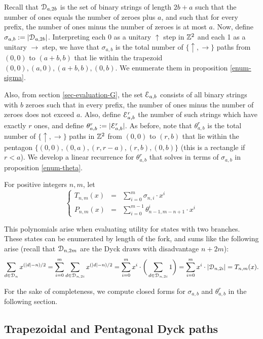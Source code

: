 Recall that $\mathcal{D}_{a,2b}$ is the set of binary strings of length $2b+a$ such that the number of ones equals the number of zeroes plus $a$, and such that for every prefix, the number of ones minus the number of zeroes is at most $a$. Now, define $\sigma_{a,b}:=|\mathcal{D}_{a,2b}|$. Interpreting each 0 as a unitary $\uparrow$ step in $\mathbb{Z}^2$ and each 1 as a unitary $\rightarrow$ step, we have that $\sigma_{a,b}$ is the total number of $\{\uparrow,\rightarrow\}$ paths from $(0,0)$ to $(a+b,b)$ that lie within the trapezoid ${(0,0),(a,0),(a+b,b),(0,b)}$. We enumerate them in proposition \ref{enum-sigma}.

Also, from section \ref{sec-evaluation-G}, the set $\mathcal{E}_{a,b}$ consists of all binary strings with $b$ zeroes such that in every prefix, the number of ones minus the number of zeroes does not exceed $a$. Also, define $\mathcal{E}_{a,b}^r$ the number of such strings which have exactly $r$ ones, and define $\theta_{a,b}^r:= |\mathcal{E}_{a,b}^r|$. As before, note that $\theta_{a,b}^r$ is the total number of $\{\uparrow,\rightarrow\}$ paths in $\mathbb{Z}^2$ from $(0,0)$ to $(r,b)$ that lie within the pentagon $\{(0,0),(0,a),(r,r-a), (r,b), (0,b)\}$ (this is a rectangle if $r<a$). We develop a linear recurrence for $\theta_{a,b}^r$ that solves in terms of $\sigma_{a,b}$ in proposition \ref{enum-theta}. 

\begin{mydef}
For positive integers $n,m$, let
$$
\left\{
\begin{array}{lll}
T_{n,m}(x) &=& \displaystyle \sum_{i = 0}^{m} \sigma_{n,i}\cdot x^i\\
P_{n,m}(x) &=& \displaystyle \sum_{i = 0}^{m-1} \theta_{n-1,m-n+1}^i\cdot x^i
\end{array}
\right.
$$
\end{mydef}

This polynomials arise when evaluating utility for states with two branches. These states can be enumerated by length of the fork, and sums like the following arise (recall that $\mathcal{D}_{n,2m}$ are the Dyck draws with disadvantage $n+2m$):
$$
\sum_{d\in \mathcal{D}_{n}} x^{(|d|-n)/2} = \sum_{i=0}^m \sum_{d\in \mathcal{D}_{n,2i}} x^{(|d|-n)/2} = \sum_{i=0}^m x^i\cdot  \bigg(\sum_{d\in\mathcal{D}_{n,2i}} 1\bigg) = \sum_{i=0}^m x^i\cdot |\mathcal{D}_{n,2i}| = T_{n,m}(x).
$$

For the sake of completeness, we compute closed forms for $\sigma_{a,b}$ and $\theta_{a,b}^r$ in the following section.



\subsection*{Trapezoidal and Pentagonal Dyck paths}
 \label{appendix-trapezoid}
 
